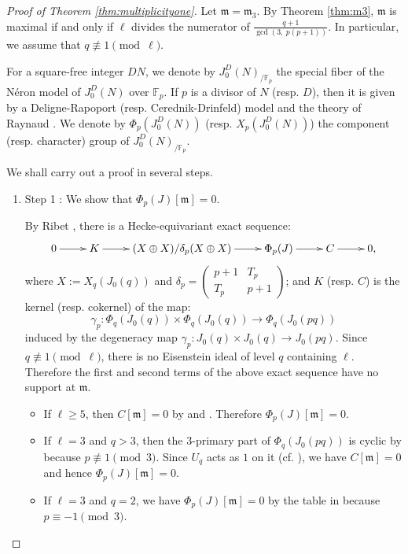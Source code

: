 \documentclass[a4paper, 12pt]{amsart}
\theoremstyle{definition}
\theoremstyle{remark}
\numberwithin{equation}{section} \numberwithin{table}{section}
\begin{document}
\begin{proof}[Proof of Theorem \ref{thm:multiplicityone}]
Let ${{\mathfrak{m}}}={{\mathfrak{m}}}_3$. By Theorem \ref{thm:m3}, ${{\mathfrak{m}}}$ is maximal if and only if $\ell$ divides the numerator of $\frac{q+1}{\gcd(3, ~p(p+1))}$. In particular, we assume that $q\not\equiv 1 {{ \!\pmod {\ell}}}$. 

For a square-free integer $DN$, we denote by $J_0^D(N)_{/{{{\mathbb{F}}}_p}}$ the special fiber of the N\'eron model of $J_0^D(N)$ over ${{\mathbb{F}}}_p$. If $p$ is a divisor of $N$ (resp. $D$), then it is given by a Deligne-Rapoport (resp. Cerednik-Drinfeld) model \cite{Bu97, Ce76, DR73, Dr76} and the theory of Raynaud \cite{Ra70}. We denote by $\Phi_p(J_0^D(N))$ (resp. $X_p(J_0^D(N))$) the component (resp. character) group of $J_0^D(N)_{/{{{\mathbb{F}}}_p}}$. 

We shall carry out a proof in several steps. 
\begin{enumerate}
\item Step 1 : We show that $\Phi_p(J)[{{\mathfrak{m}}}]=0$. 

By Ribet \cite[Theorem 4.3]{R90}, there is a Hecke-equivariant exact sequence:
$$
\xymatrix{
0 \ar[r] & K \ar[r] & (X\oplus X)/{\delta_p (X\oplus X)} \ar[r] & \Phi_p(J) \ar[r] & C \ar[r] & 0,
}
$$
where $X:=X_q(J_0(q))$ and $\delta_p = {
 \left(  \begin{smallmatrix} {p+1} & {T_p} \\ {T_p} & {p+1} \end{smallmatrix} \right)}$; and
$K$ (resp. $C$) is the kernel (resp. cokernel) of the map:
$$
\gamma_p : \Phi_q(J_0(q)) \times \Phi_q(J_0(q)) \rightarrow \Phi_q(J_0(pq))
$$
induced by the degeneracy map $\gamma_p : J_0(q) \times J_0(q) \rightarrow J_0(pq)$.
Since $q \not\equiv 1 {{ \!\pmod {\ell}}}$, there is no Eisenstein ideal of level $q$ containing $\ell$.
Therefore the first and second terms of the above exact sequence have no support at ${{\mathfrak{m}}}$.

\begin{itemize}
\item 
If $\ell\geq 5$, then $C[{{\mathfrak{m}}}]=0$ by \cite[Proposition A.5]{Yoo14a} and \cite[Corollary A.6]{Yoo14a}.
Therefore $\Phi_p(J)[{{\mathfrak{m}}}]=0$.
\item
If $\ell=3$ and $q>3$, then the $3$-primary part of $\Phi_q(J_0(pq))$ is cyclic by \cite[.1]{Ed91} because $p\not\equiv 1 \pmod {3}$.  Since $U_q$ acts as $1$ on it (cf. \cite[Proposition A.2]{Yoo14a}), we have $C[{{\mathfrak{m}}}]=0$ and hence $\Phi_p(J)[{{\mathfrak{m}}}]=0$.
\item
If $\ell=3$ and $q=2$, we have $\Phi_p(J)[{{\mathfrak{m}}}]=0$ by the table in \cite[p. 210]{Og85} because $p\equiv -1\pmod 3$.  
\end{itemize}


\end{enumerate}
\end{proof}
\end{document}

